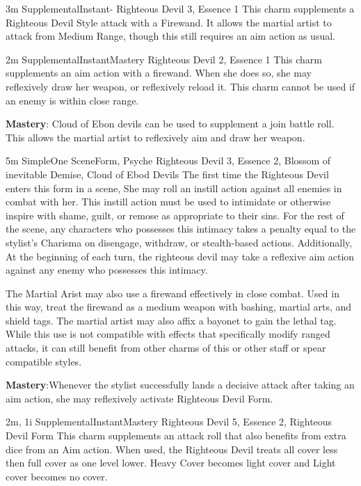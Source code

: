 
{3m}
{Supplemental}{Instant}{-}
{Righteous Devil 3, Essence 1}
This charm supplements a Righteous Devil Style attack with a Firewand.
It allows the martial artist to attack from Medium Range, though this still requires an aim action as usual.

{2m}
{Supplemental}{Instant}{Mastery}
{Righteous Devil 2, Essence 1}
This charm supplements an aim action with a firewand.
When she does so, she may reflexively draw her weapon, or reflexively reload it.
This charm cannot be used if an enemy is within close range.

\textbf{Mastery}: Cloud of Ebon devils can be used to supplement a join battle roll.
This allows the martial artist to reflexively aim and draw her weapon.

 
{5m}
{Simple}{One Scene}{Form, Psyche}
{Righteous Devil 3, Essence 2, Blossom of inevitable Demise, Cloud of Ebod Devils}
The first time the Righteous Devil enters this form in a scene,
She may roll an instill action against all enemies in combat with her.
This instill action must be used to intimidate or otherwise inspire with shame, guilt, or remose as appropriate to their sins.
For the rest of the scene, any characters who possesses this intimacy takes a penalty equal to the stylist's Charisma on disengage, withdraw, or stealth-based actions.
Additionally, At the beginning of each turn, the righteous devil may take a reflexive aim action against any enemy who possesses this intimacy.

The Martial Arist may also use a firewand effectively in close combat.
Used in this way, treat the firewand as a medium weapon with bashing, martial arts, and shield tags.
The martial artist may also affix a bayonet to gain the lethal tag.
While this use is not compatible with effects that specifically modify ranged attacks, it can still benefit from other charms of this or other staff or spear compatible styles.

\textbf{Mastery}:Whenever the stylist successfully lands a decisive attack after taking an aim action,
she may reflexively activate Righteous Devil Form.

{2m, 1i}
{Supplemental}{Instant}{Mastery}
{Righteous Devil 5, Essence 2, Righteous Devil Form}
This charm supplements an attack roll that also benefits from extra dice from an Aim action.
When used, the Righteous Devil treats all cover less then full cover as one level lower.
Heavy Cover becomes light cover and Light cover becomes no cover.

